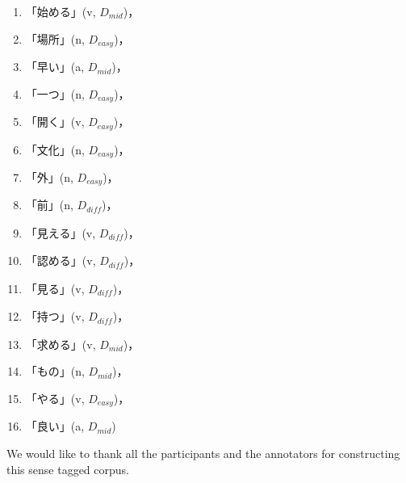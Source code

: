 \documentclass[english]{jnlp_1.4}
\begin{document}
\begin{enumerate}
\item 「始める」(v, $D_{mid}$)，
\item 「場所」(n, $D_{easy}$)，
\item 「早い」(a, $D_{mid}$)，
\item 「一つ」(n, $D_{easy}$)，
\item 「開く」(v, $D_{easy}$)，
\item 「文化」(n, $D_{easy}$)，
\item 「外」(n, $D_{easy}$)，
\item 「前」(n, $D_{\mathit{diff}}$)，
\item 「見える」(v, $D_{\mathit{diff}}$)，
\item 「認める」(v, $D_{\mathit{diff}}$)，
\item 「見る」(v, $D_{\mathit{diff}}$)，
\item 「持つ」(v, $D_{\mathit{diff}}$)，
\item 「求める」(v, $D_{mid}$)，
\item 「もの」(n, $D_{mid}$)，
\item 「やる」(v, $D_{easy}$)，
\item 「良い」(a, $D_{mid}$)
\end{enumerate}



\acknowledgment

We would like to thank all the participants and the annotators for
constructing this sense tagged corpus.
\end{document}
